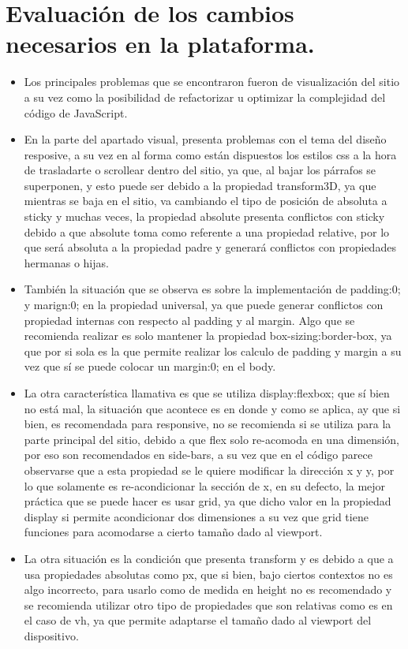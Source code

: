 \documentclass[11pt,DIV=9, letterpaper, oneside, openright]{scrartcl}
\begin{document}
\section{Evaluación de los cambios necesarios en la plataforma.}

\begin{itemize}
    
    \item Los principales problemas que se encontraron fueron de visualización del sitio a su vez como la posibilidad de refactorizar u optimizar la complejidad del código de JavaScript.
    
    \item En la parte del apartado visual, presenta problemas con el tema del diseño resposive, a su vez en al forma como están dispuestos los estilos css a la hora de trasladarte o scrollear dentro del sitio, ya que, al bajar los párrafos se superponen, y esto puede ser debido a la propiedad transform3D, ya que mientras se baja en el sitio, va cambiando el tipo de posición de absoluta a sticky y muchas veces, la propiedad absolute presenta conflictos con sticky debido a que absolute toma como referente a una propiedad relative, por lo que será absoluta a la propiedad padre y generará conflictos con propiedades hermanas o hijas.
    
    \item También la situación que se observa es sobre la implementación de padding:0; y marign:0; en la propiedad universal, ya que puede generar conflictos con propiedad internas con respecto al padding y al margin. Algo que se recomienda realizar es solo mantener la propiedad box-sizing:border-box, ya que por si sola es la que permite realizar los calculo de padding y margin a su vez que sí se puede colocar un margin:0; en el body.
    
    \item La otra característica llamativa es que se utiliza display:flexbox; que sí bien no está mal, la situación que acontece es en donde y como se aplica, ay que si bien, es recomendada para responsive, no se recomienda si se utiliza para la parte principal del sitio, debido a que flex solo re-acomoda en una dimensión, por eso son recomendados en side-bars, a su vez que en el código parece observarse que a esta propiedad se le quiere modificar la dirección x y y, por lo que solamente es re-acondicionar la sección de x, en su defecto, la mejor práctica que se puede hacer es usar grid, ya que dicho valor en la propiedad display si permite acondicionar dos dimensiones a su vez que grid tiene funciones para acomodarse a cierto tamaño dado al viewport.
    \item La otra situación es la condición que presenta transform y es debido a que a usa propiedades absolutas como px, que si bien, bajo ciertos contextos no es algo incorrecto, para usarlo como de medida en height no es recomendado y se recomienda utilizar otro tipo de propiedades que son relativas como es en el caso de vh, ya que permite adaptarse el tamaño dado al viewport del dispositivo.
    

\end{itemize}
\end{document}
